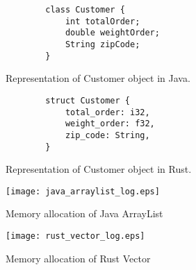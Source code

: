 \begin{figure}[htb]
    \begin{lstlisting}
        class Customer {
            int totalOrder;
            double weightOrder;
            String zipCode;
        }
    \end{lstlisting}
    \caption{Representation of Customer object in Java.}
    \label{fig:Sampling}    
\end{figure}

\begin{figure}[htb]
    \begin{lstlisting}
        struct Customer {
            total_order: i32,
            weight_order: f32,
            zip_code: String,
        }
    \end{lstlisting}
    \caption{Representation of Customer object in Rust.}
    \label{fig:Sampling}
\end{figure}

\begin{figure}[htb]
    \texttt{[image: java\_arraylist\_log.eps]}
    \caption{Memory allocation of Java ArrayList}
    \label{fig:Sampling}
\end{figure}

\begin{figure}[htb]
    \texttt{[image: rust\_vector\_log.eps]}
    \caption{Memory allocation of Rust Vector}
    \label{fig:Sampling}
\end{figure}